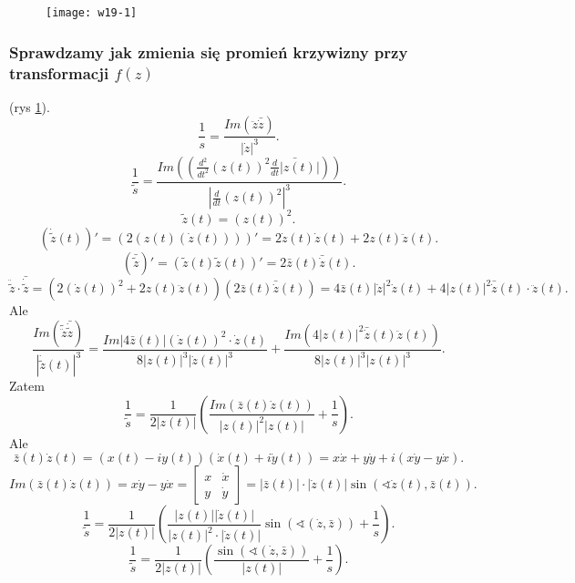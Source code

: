 \documentclass[../main.tex]{subfiles}
\begin{document}
     \begin{figure}[h]
        \centering
        \texttt{[image: w19-1]}
        \caption{}
        \label{fig:w19-1}
    \end{figure}
    \subsubsection{Sprawdzamy jak zmienia się promień krzywizny przy transformacji $f(z)$} (rys \ref{fig:w19-1}).
    \[
        \frac{1}{s} = \frac{Im(\ddot{z}\bar{\dot{z}})}{\left| \dot{z} \right| ^3}
    .\]
\[
    \frac{1}{\tilde s} = \frac{Im\left(\left(\frac{d^2}{dt^2}\left( z(t) \right) ^2 \bar{\frac{d}{dt}|z(t)|}\right)\right)}{\left| \frac{d}{dt}\left( z(t) \right) ^2 \right| ^3}
.\]
\[
    \tilde z (t) = \left( z(t) \right) ^2
.\]
\[
    \left( \dot{\tilde z}(t) \right)' = \left( 2\left(z(t)\left( \dot{z}(t) \right) \right) \right)' = 2 \dot{z}(t) \dot{z}(t) + 2z(t) \ddot{z}(t)
.\]
\[
    \left( \bar{\tilde z} \right)' = \left( \tilde z(t) \tilde z(t) \right)' = 2 \bar{z}(t) \bar{\dot{z}}(t)
.\]
\[
    \ddot{\tilde z} \cdot \bar{\dot{\tilde z}} = \left( 2(\dot{z}(t))^2 + 2z(t)\ddot{z}(t)\right)\left( 2\bar{z}(t)\bar{\dot{z}}(t) \right) = 4\bar{z}(t) \left| \dot{z} \right| ^2 \dot{z}(t) + 4\left| z(t) \right| ^2 \bar{\dot{z}}(t) \cdot \ddot{z}(t)
.\]
Ale
\[
    \frac{Im( \tilde \ddot{z} \bar{\dot{\tilde z}})}{\left| \dot{\tilde z}(t) \right|^3 } = \frac{Im\left| 4\bar{z}(t) \right| (\dot{z}(t))^2 \cdot \dot{z}(t)}{8\left| z(t) \right| ^3 \left| \dot{z}(t) \right| ^3} + \frac{Im(4 \left| z(t) \right| ^2 \bar{\dot{z}}(t) \ddot{z}(t))}{8\left| z(t) \right| ^3 \left| z(t) \right| ^3}
.\]
Zatem
\[
    \frac{1}{\tilde s} = \frac{1}{2\left| z(t) \right| }\left( \frac{Im\left( \bar{z}(t)\dot{z}(t) \right) }{\left| z(t) \right| ^2 \left| z(t) \right|} + \frac{1}{s} \right)
.\]
Ale
\[
    \bar{z}(t) \dot{z}(t) = \left( x(t) - iy(t) \right) \left( \dot{x}(t) + i\dot{y}(t) \right) = x\dot{x} + y\dot{y} + i\left( x\dot{y} - y\dot{x} \right)
.\]
\[
    Im\left( \bar{z}(t)\dot{z}(t) \right) = x\dot{y} - y\dot{x} = \begin{bmatrix} x&\dot{x}\\ y&\dot{y} \end{bmatrix} = \left| \bar{z}(t) \right|\cdot \left| \dot{z}(t) \right| \sin(\sphericalangle \dot{z}(t), \bar{z}(t))
.\]
\[
    \frac{1}{\tilde s} = \frac{1}{2\left| z(t) \right| }\left( \frac{\left| z(t) \right| \left| \dot{z}(t) \right| }{\left| z(t) \right| ^2 \cdot \left| \dot{z}(t) \right| } \sin(\sphericalangle(\dot{z}, \bar{z})) + \frac{1}{s}\right)
.\]
\[
    \frac{1}{\tilde s} = \frac{1}{2 \left| z(t) \right| } \left( \frac{\sin(\sphericalangle(\dot{z}, \bar{z}))}{\left| z(t) \right| } + \frac{1}{s} \right)
.\]
\end{document}
